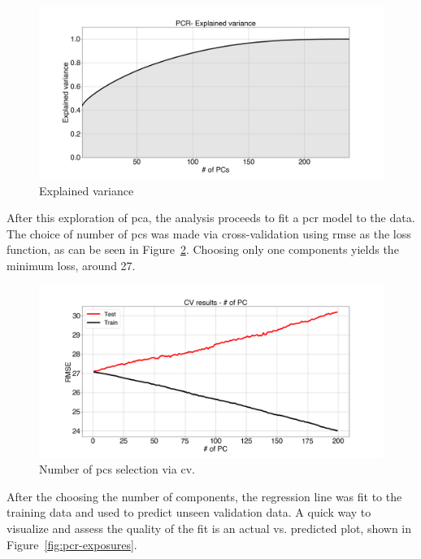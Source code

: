 \begin{figure}[h]
	\centering
	\includegraphics[width=1\textwidth]{../figures/pcr-explained-variance.png}
	\caption{Explained variance}
	\label{fig:pcr-exp-var}
\end{figure}

After this exploration of \acrshort{pca}, the analysis proceeds to fit a \acrshort{pcr} model to the data. The choice of number of \acrshort{pc}s was made via cross-validation using \acrshort{rmse} as the loss function, as can be seen in Figure~\ref{fig:pcr-cv-exposures}. Choosing only one components yields the minimum loss, around 27.

\begin{figure}[h]
	\centering
	\includegraphics[width=1\textwidth]{../figures/pcr-cv-exposures.png}
	\caption{Number of \acrshort{pc}s selection via \acrshort{cv}.}
	\label{fig:pcr-cv-exposures}
\end{figure}

After the choosing the number of components, the regression line was fit to the training data and used to predict unseen validation data. A quick way to visualize and assess the quality of the fit is an actual vs. predicted plot,  shown in Figure~\ref{fig:pcr-exposures}.

